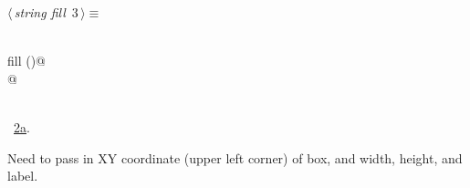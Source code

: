 \documentclass{article}
\renewcommand{\NWtarget}[2]{\hypertarget{#1}{#2}}
\renewcommand{\NWlink}[2]{\hyperlink{#1}{#2}}
\begin{document}
\begin{flushleft} \small
\begin{minipage}{\linewidth}\label{scrap3}\raggedright\small
\NWtarget{nuweb3}{} $\langle\,${\it string fill}\nobreak\ {\footnotesize {3}}$\,\rangle\equiv$
\vspace{-1ex}
\begin{list}{}{} \item
\mbox{}\verb@@\\
\mbox{}\verb@string fill ()@\\
\mbox{}@\\
\mbox{}\verb@@\\
\mbox{}\verb@@{\NWsep}
\end{list}
\vspace{-1.5ex}
\footnotesize
\begin{list}{}{\setlength{\itemsep}{-\parsep}\setlength{\itemindent}{-\leftmargin}}
\item \NWtxtMacroRefIn\ \NWlink{nuweb2a}{2a}.

\item{}
\end{list}
\end{minipage}\vspace{4ex}
\end{flushleft}
Need to pass in XY coordinate (upper left corner) of box, and width, height, and label.
\end{document}
